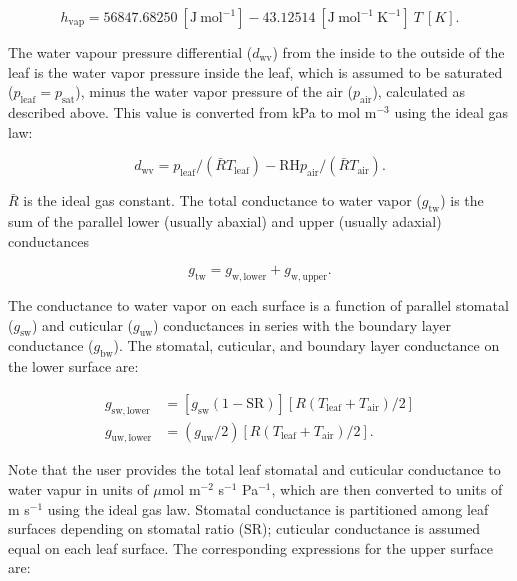 \documentclass[11pt, oneside]{article}
\begin{document}
\begin{equation}
  h_\mathrm{vap} = 56847.68250~[\mathrm{J~mol}^{-1}] - 43.12514~[\mathrm{J~mol}^{-1}~\mathrm{K}^{-1}]~T~[K].
\end{equation}

The water vapour pressure differential ($d_\mathrm{wv}$) from the inside to the outside of the leaf is the water vapor pressure inside the leaf, which is assumed to be saturated ($p_\mathrm{leaf} = p_\mathrm{sat}$), minus the water vapor pressure of the air ($p_\mathrm{air}$), calculated as described above. This value is converted from kPa to mol m$^{-3}$ using the ideal gas law:

\begin{equation}
  \label{eq:d_wv}
  d_\mathrm{wv} = p_\mathrm{leaf} / (\bar{R} T_\mathrm{leaf}) - \mathrm{RH} p_\mathrm{air} / (\bar{R} T_\mathrm{air}).
\end{equation}

$\bar{R}$ is the ideal gas constant. The total conductance to water vapor ($g_\mathrm{tw}$) is the sum of the parallel lower (usually abaxial) and upper (usually adaxial) conductances

\begin{equation}
  \label{eq:g_tw}
  g_\mathrm{tw} = g_\mathrm{w,lower} + g_\mathrm{w,upper}.
\end{equation} 

The conductance to water vapor on each surface is a function of parallel stomatal ($g_\mathrm{sw}$) and cuticular ($g_\mathrm{uw}$) conductances in series with the boundary layer conductance ($g_\mathrm{bw}$). The stomatal, cuticular, and boundary layer conductance on the lower surface are:

\begin{align}
  g_\mathrm{sw,lower} & = [g_\mathrm{sw} (1 - \mathrm{SR})] [R (T_\mathrm{leaf} + T_\mathrm{air}) / 2] \\
  g_\mathrm{uw,lower} & = (g_\mathrm{uw} / 2) [R (T_\mathrm{leaf} + T_\mathrm{air}) / 2].
\end{align}

Note that the user provides the total leaf stomatal and cuticular conductance to water vapur in units of $\mu$mol m$^{-2}$ s$^{-1}$ Pa$^{-1}$, which are then converted to units of m s$^{-1}$ using the ideal gas law. Stomatal conductance is partitioned among leaf surfaces depending on stomatal ratio ($\mathrm{SR}$); cuticular conductance is assumed equal on each leaf surface. The corresponding expressions for the upper surface are:
\end{document}
